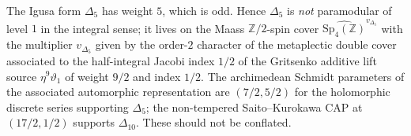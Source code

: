 \begin{remark}
\label{rem:k3e-maass-spin-cover}
The Igusa form $\Delta_5$ has weight $5$, which is odd. Hence $\Delta_5$ is
\emph{not} paramodular of level $1$ in the integral sense; it lives on the Maass
$\mathbb{Z}/2$-spin cover $\widehat{\mathrm{Sp}_4(\mathbb{Z})}^{v_{\Delta_5}}$ with
the multiplier $v_{\Delta_5}$ given by the order-$2$ character of the metaplectic
double cover associated to the half-integral Jacobi index $1/2$ of the Gritsenko
additive lift source $\eta^9\vartheta_1$ of weight $9/2$ and index $1/2$. The
archimedean Schmidt parameters of the associated automorphic representation are
$(7/2,5/2)$ for the holomorphic discrete series supporting $\Delta_5$; the
non-tempered Saito--Kurokawa CAP at $(17/2,1/2)$ supports $\Delta_{10}$. These
should not be conflated.
\end{remark}


